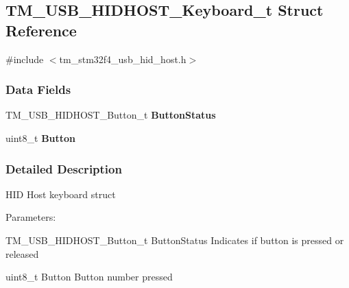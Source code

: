 \hypertarget{struct_t_m___u_s_b___h_i_d_h_o_s_t___keyboard__t}{}\subsection{T\+M\+\_\+\+U\+S\+B\+\_\+\+H\+I\+D\+H\+O\+S\+T\+\_\+\+Keyboard\+\_\+t Struct Reference}
\label{struct_t_m___u_s_b___h_i_d_h_o_s_t___keyboard__t}


{\ttfamily \#include $<$tm\+\_\+stm32f4\+\_\+usb\+\_\+hid\+\_\+host.\+h$>$}

\subsubsection*{Data Fields}
\begin{DoxyCompactItemize}
\item 
\hypertarget{struct_t_m___u_s_b___h_i_d_h_o_s_t___keyboard__t_a2792ba6f429d1e26ddbb9555e95d82bf}{}T\+M\+\_\+\+U\+S\+B\+\_\+\+H\+I\+D\+H\+O\+S\+T\+\_\+\+Button\+\_\+t {\bfseries Button\+Status}\label{struct_t_m___u_s_b___h_i_d_h_o_s_t___keyboard__t_a2792ba6f429d1e26ddbb9555e95d82bf}

\item 
\hypertarget{struct_t_m___u_s_b___h_i_d_h_o_s_t___keyboard__t_a7a538d900b633de471b9931dc7dab941}{}uint8\+\_\+t {\bfseries Button}\label{struct_t_m___u_s_b___h_i_d_h_o_s_t___keyboard__t_a7a538d900b633de471b9931dc7dab941}

\end{DoxyCompactItemize}


\subsubsection{Detailed Description}
H\+I\+D Host keyboard struct

Parameters\+:
\begin{DoxyItemize}
\item T\+M\+\_\+\+U\+S\+B\+\_\+\+H\+I\+D\+H\+O\+S\+T\+\_\+\+Button\+\_\+t Button\+Status Indicates if button is pressed or released
\item uint8\+\_\+t Button Button number pressed 
\end{DoxyItemize}